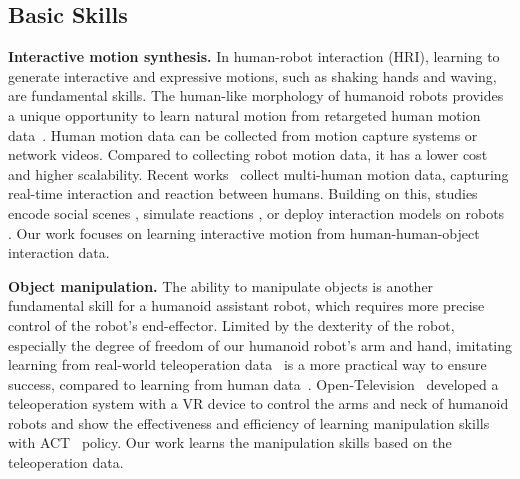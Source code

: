 \subsection{Basic Skills}
\noindent\textbf{Interactive motion synthesis.}
In human-robot interaction (HRI), learning to generate interactive and expressive motions, such as shaking hands and waving, are fundamental skills. 
The human-like morphology of humanoid robots provides a unique opportunity to learn natural motion from retargeted human motion data~\citep{fuHumanPlusHumanoidShadowing2024}. Human motion data can be collected from motion capture systems or network videos. Compared to collecting robot motion data, it has a lower cost and higher scalability.
Recent works~\cite{liangInterGenDiffusionbasedMultihuman2024, xuInterXVersatileHumanHuman2023} collect multi-human motion data, capturing real-time interaction and reaction between humans. 
Building on this, studies encode social scenes \cite{mascaroRobotInteractionBehavior2024}, simulate reactions \cite{liuPhysReactionPhysicallyPlausible2024}, or deploy interaction models on robots \cite{prasadMoVEIntMixtureVariational2024}. Our work focuses on learning interactive motion from human-human-object interaction data.

\noindent\textbf{Object manipulation.}
The ability to manipulate objects is another fundamental skill for a humanoid assistant robot, which requires more precise control of the robot's end-effector.
Limited by the dexterity of the robot, especially the degree of freedom of our humanoid robot's arm and hand, imitating learning from real-world teleoperation data~\cite{chi2023diffusion,pari2021surprising,mandlekar2021matters} is a more practical way to ensure success, compared to learning from human data~\cite{wang2023mimicplay, qin2024anyteleopgeneralvisionbaseddexterous, zhu2024vision}.
Open-Television~\cite{cheng2024tv} developed a teleoperation system with a VR device to control the arms and neck of humanoid robots and show the effectiveness and efficiency of learning manipulation skills with ACT~\cite{zhao2023learning} policy.
Our work learns the manipulation skills based on the teleoperation data.

